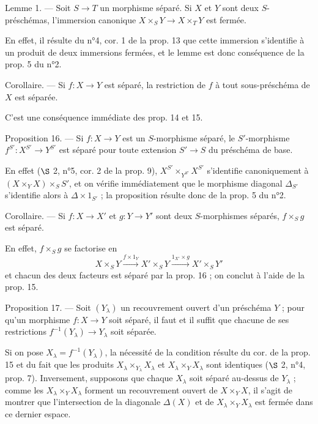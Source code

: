 \newpage


\noindent Lemme 1. --- Soit $S \to T$ un morphisme séparé. Si $X$ et $Y$ sont deux $S$-préschémas, l'immersion canonique $X \times_S Y \to X \times_T Y$ est fermée.

En effet, il résulte du n°4, cor. 1 de la prop. 13 que cette immersion s'identifie à un produit de deux immersions fermées, et le lemme est donc conséquence de la prop. 5 du n°2.

Corollaire. --- Si $f : X \to Y$ est séparé, la restriction de $f$ à tout sous-préschéma de $X$ est séparée.

C'est une conséquence immédiate des prop. 14 et 15.

Proposition 16. --- Si $f : X \to Y$ est un $S$-morphisme séparé, le $S'$-morphisme $f^{S'} : X^{S'} \to Y^{S'}$ est séparé pour toute extension $S' \to S$ du préschéma de base.

En effet ($\S$ 2, n°5, cor. 2 de la prop. 9), $X^{S'} \times_{Y^{S'}} X^{S'}$ s'identifie canoniquement à $(X \times_Y X) \times_S S'$, et on vérifie immédiatement que le morphisme diagonal $\Delta_{S'}$ s'identifie alors à $\Delta \times 1_{S'}$ ; la proposition résulte donc de la prop. 5 du n°2.

Corollaire. --- Si $f : X \to X'$ et $g : Y \to Y'$ sont deux $S$-morphismes séparés, $f \times_S g$ est séparé.

En effet, $f \times_S g$ se factorise en
$$ X \times_S Y \xrightarrow{f \times 1_Y} X' \times_S Y \xrightarrow{1_{X'} \times g} X' \times_S Y' $$
et chacun des deux facteurs est séparé par la prop. 16 ; on conclut à l'aide de la prop. 15.

Proposition 17. --- Soit $(Y_\lambda)$ un recouvrement ouvert d'un préschéma $Y$ ; pour qu'un morphisme $f : X \to Y$ soit séparé, il faut et il suffit que chacune de ses restrictions $f^{-1}(Y_\lambda) \to Y_\lambda$ soit séparée.

Si on pose $X_\lambda = f^{-1}(Y_\lambda)$, la nécessité de la condition résulte du cor. de la prop. 15 et du fait que les produits $X_\lambda \times_{Y_\lambda} X_\lambda$ et $X_\lambda \times_Y X_\lambda$ sont identiques ($\S$ 2, n°4, prop. 7). Inversement, supposons que chaque $X_\lambda$ soit séparé au-dessus de $Y_\lambda$ ; comme les $X_\lambda \times_Y X_\lambda$ forment un recouvrement ouvert de $X \times_Y X$, il s'agit de montrer que l'intersection de la diagonale $\Delta(X)$ et de $X_\lambda \times_Y X_\lambda$ est fermée dans ce dernier espace.

